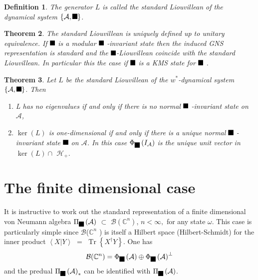 \documentclass[aps,preprint]{revtex4}%
\providecommand{\U}[1]{\protect\rule{.1in}{.1in}}
\newtheorem{theorem}{Theorem}
\newtheorem{definition}[theorem]{Definition}
\begin{document}
\begin{definition}
The generator $L$ is called the \emph{standard Liouvillean} of the dynamical
system $\left\{  \mathcal{A},\U{3c4} \right\}  $.
\end{definition}

\begin{theorem}
The standard Liouvillean is uniquely defined up to unitary equivalence. If
$\U{3c9} $ is a modular $\U{3c4} $ -invariant state then the induced GNS
representation is standard and the $\U{3c9} $-Liouvillean coincide with the
standard Liouvillean. In particular this the case if $\U{3c9} $ is a
\emph{KMS} state for $\U{3c4} $ .
\end{theorem}

\begin{theorem}
Let $L$ be the standard Liouvillean of the $w^{\ast}$-dynamical system
$\left\{  \mathcal{A},\U{3c4} \right\}  $. Then

\begin{enumerate}
\item L has no eigenvalues if and only if there is no normal $\U{3c4} $
-invariant state on $\mathcal{A}$,

\item $\ker(L)$ is one-dimensional if and only if there is a unique normal
$\U{3c4} $ -invariant state $\U{3c9} $ on $\mathcal{A}$. In this case
$\Phi_{\U{3c9} }\left(  I_{\mathcal{A}}\right)  $ is the unique unit vector in
$\ker(L)\cap$ $\mathcal{H}_{+}$.
\end{enumerate}
\end{theorem}

\section{The finite dimensional case}

It is instructive to work out the standard representation of a finite
dimensional von Neumann algebra $\Pi_{\U{3c9} }\left(  \mathcal{A}\right)  $
$\subset$ $\mathcal{B}(\mathbb{C}^{n})$, $n<\infty,$ for any state $\omega$.
This case is particularly simple since $\mathcal{B}$($\mathbb{C}^{n}$ ) is
itself a Hilbert space (Hilbert-Schmidt) for the inner product $\left\langle
X|Y\right\rangle $ $=$ $\operatorname{Tr}\left\{  X^{\dagger}Y\right\}  $. One
has
\begin{equation}
\mathcal{B}(\mathbb{C}^{n})=\Phi_{\U{3c9} }\left(  \mathcal{A}\right)
\oplus\Phi_{\U{3c9} }\left(  \mathcal{A}\right)  ^{\perp}%
\end{equation}
and the predual $\Pi_{\U{3c9} }\left(  \mathcal{A}\right)  _{\ast}$ can be
identified with $\Pi_{\U{3c9} }\left(  \mathcal{A}\right)  $.
\end{document}
